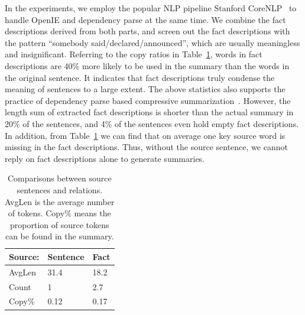 \documentclass[letterpaper]{article} %
\begin{document}
	In the experiments, we employ the popular NLP pipeline Stanford CoreNLP~\cite{manning-EtAl:2014:P14-5} to handle OpenIE and dependency parse at the same time. 
	We combine the fact descriptions derived from both parts, and screen out the fact descriptions with the pattern ``somebody said/declared/announced'', which are usually meaningless and insignificant.
	Referring to the copy ratios in Table~\ref{tb:relation_info}, words in fact descriptions are 40\% more likely to be used in the summary than the words in the original sentence.
	It indicates that fact descriptions truly condense the meaning of sentences to a large extent.
	The above statistics also supports the practice of dependency parse based compressive summarization~\cite{knight2002summarization}.
	However, the length sum of extracted fact descriptions is shorter than the actual summary in 20\% of the sentences, and 4\% of the sentences even hold empty fact descriptions.
	In addition, from Table~\ref{tb:relation_info} we can find that on average one key source word is missing in the fact descriptions.
	Thus, without the source sentence, we cannot reply on fact descriptions alone to generate summaries. 
	
	\begin{table}[ht]
		\centering
		\begin{tabular}{l|ll}
			\hline
			Source:  & Sentence & Fact \\ \hline
			AvgLen   & 31.4     & 18.2      \\
			Count & 1        & 2.7       \\
			Copy\%  & 0.12      & 0.17         \\ \hline
		\end{tabular}
		\caption{Comparisons between source sentences and relations. AvgLen is the average number of tokens. Copy\% means the proportion of source tokens can be found in the summary.}
		\label{tb:relation_info}
	\end{table}
	
\end{document}

